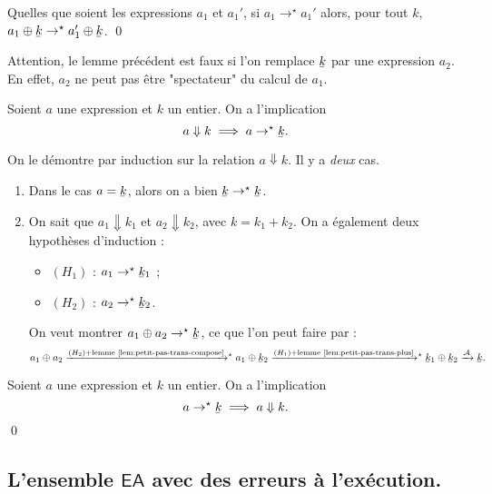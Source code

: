 \documentclass[../main]{subfiles}
\begin{document}
  \begin{lem}\label{lem:petit-pas-trans-plus}
    Quelles que soient les expressions $a_1$ et $a_1'$, si $a_1 \to^\star a_1'$ alors, pour tout $k$, $a_1 \oplus \ubar k \to^\star a_1' \oplus \ubar k$.
    \qed
  \end{lem}

  Attention, le lemme précédent est faux si l'on remplace $\ubar k$ par une expression $a_2$.
  En effet, $a_2$ ne peut pas être "spectateur" du calcul de $a_1$.

  \begin{prop}
    Soient $a$ une expression et $k$ un entier.
    On a l'implication \[
    a \Downarrow k \implies a \to^\star \ubar k
    .\]
  \end{prop}

  \begin{prv}
    On le démontre par induction sur la relation $a\Downarrow k$.
    Il y a \textit{deux} cas.
    \begin{enumerate}
      \item Dans le cas $a = \ubar k$, alors on a bien $\ubar k \to^\star \ubar k$.
      \item On sait que $a_1 \Downarrow k_1$ et $a_2 \Downarrow k_2$, avec $k = k_1 + k_2$.
        On a également deux hypothèses d'induction : 
        \begin{itemize}
          \item $(H_1)$ : $a_1 \to^\star \ubar{k}_1$ ;
          \item $(H_2)$ : $a_2 \to^\star \ubar{k}_2$.
        \end{itemize}
        On veut montrer $a_1 \oplus a_2 \to^\star \ubar{k}$, ce que l'on peut faire par :
        \[
          a_1 \oplus a_2
          \xrightarrow{\smash{(H_2) + \text{lemme~\ref{lem:petit-pas-trans-compose}}}}^\star
          a_1 \oplus \ubar{k}_2
          \xrightarrow{\smash{(H_1) + \text{lemme~\ref{lem:petit-pas-trans-plus}}}}^\star
          \ubar{k}_1 \oplus \ubar{k}_2
          \xrightarrow{\mathcal{A}} \ubar k
        .\] 
    \end{enumerate}
  \end{prv}

  \begin{prop}
    Soient $a$ une expression et $k$ un entier.
    On a l'implication \[
    a \to^\star \ubar k \implies a \Downarrow k
    .\]
    \qed
  \end{prop}

  \subsection{L'ensemble $\mathsf{EA}$ avec des erreurs à l'exécution.}
\end{document}
